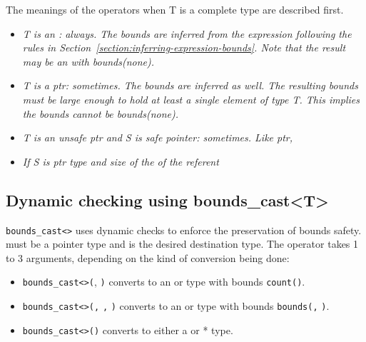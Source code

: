 The meanings of the operators when T is a complete type are described
first.

\begin{quote}
\end{quote}

\begin{itemize}
\item
  \it{T is an \arrayptr: always. The bounds are inferred from the
  expression following the rules in Section~\ref{section:inferring-expression-bounds}.
   Note that the result may
  be an \arrayptr with bounds(none).}
\item
  \it{T is a ptr: sometimes. The bounds are inferred as well. The
  resulting bounds must be large enough to hold at least a single
  element of type T. This implies the bounds cannot be bounds(none).}
\item
  \it{T is an unsafe ptr and S is safe pointer: sometimes. Like ptr, }
    \item
    \it{If S is ptr type and size of the of the referent }
\end{itemize}

\subsection{Dynamic checking using bounds\_cast\textless{}T\textgreater{}}
\label{dynamic-checking-using-boundsux5fcastt}

\texttt{bounds\_cast\textless{}}\texttt{\textgreater{}} uses
dynamic checks to enforce the preservation of bounds safety. 
must be a pointer type and is the desired destination type. The operator
takes 1 to 3 arguments, depending on the kind of conversion being done:

\begin{itemize}
\item
  \texttt{bounds\_cast\textless{}}\texttt{\textgreater{}(},
  \texttt{)} converts  to an \arrayptr or
  \arrayview type with bounds
  \texttt{count(}\texttt{)}.
\item
  \texttt{bounds\_cast\textless{}}\texttt{\textgreater{}(}\texttt{,}
  \texttt{,} \texttt{)} converts  to an
  \arrayptr or \arrayview type with bounds
  \texttt{bounds(}\texttt{,} \texttt{)}.
\item
  \texttt{bounds\_cast\textless{}}\texttt{\textgreater{}(}\texttt{)}
  converts  to either a \ptr or * type.
\end{itemize}


